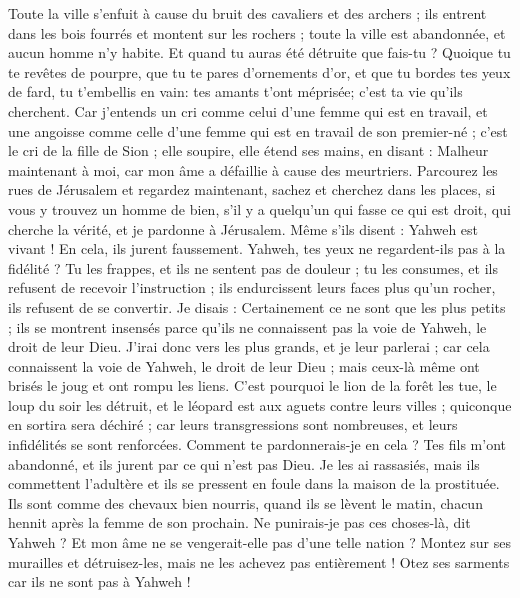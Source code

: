 \begin{multicols}{2}
Toute la ville s'enfuit à cause du bruit des cavaliers et des archers ; ils entrent dans les bois fourrés et montent sur les rochers ; toute la ville est abandonnée, et aucun homme n'y habite.
Et quand tu auras été détruite que fais-tu ? Quoique tu te revêtes de pourpre, que tu te pares d'ornements d'or, et que tu bordes tes yeux de fard, tu t'embellis en vain: tes amants t'ont méprisée; c'est ta vie qu'ils cherchent.
Car j'entends un cri comme celui d'une femme qui est en travail, et une angoisse comme celle d'une femme qui est en travail de son premier-né ; c'est le cri de la fille de Sion ; elle soupire, elle étend ses mains, en disant : Malheur maintenant à moi, car mon âme a défaillie à cause des meurtriers. 
\VerseOne{}Parcourez les rues de Jérusalem et regardez maintenant, sachez et cherchez dans les places, si vous y trouvez un homme de bien, s'il y a quelqu'un qui fasse ce qui est droit, qui cherche la vérité, et je pardonne à Jérusalem.
Même s'ils disent : Yahweh est vivant ! En cela, ils jurent faussement.
Yahweh, tes yeux ne regardent-ils pas à la fidélité ? Tu les frappes, et ils ne sentent pas de douleur ; tu les consumes, et ils refusent de recevoir l'instruction ; ils endurcissent leurs faces plus qu'un rocher, ils refusent de se convertir.
Je disais : Certainement ce ne sont que les plus petits ; ils se montrent insensés parce qu'ils ne connaissent pas la voie de Yahweh, le droit de leur Dieu.
J'irai donc vers les plus grands, et je leur parlerai ; car cela connaissent la voie de Yahweh, le droit de leur Dieu ; mais ceux-là même ont brisés le joug et ont rompu les liens.
C'est pourquoi le lion de la forêt les tue, le loup du soir les détruit, et le léopard est aux aguets contre leurs villes ; quiconque en sortira sera déchiré ; car leurs transgressions sont nombreuses, et leurs infidélités se sont renforcées.
Comment te pardonnerais-je en cela ? Tes fils m'ont abandonné, et ils jurent par ce qui n'est pas Dieu. Je les ai rassasiés, mais ils commettent l'adultère et ils se pressent en foule dans la maison de la prostituée.
Ils sont comme des chevaux bien nourris, quand ils se lèvent le matin, chacun hennit après la femme de son prochain.
Ne punirais-je pas ces choses-là, dit Yahweh ? Et mon âme ne se vengerait-elle pas d'une telle nation ?
Montez sur ses murailles et détruisez-les, mais ne les achevez pas entièrement ! Otez ses sarments car ils ne sont pas à Yahweh !

\end{multicols}

